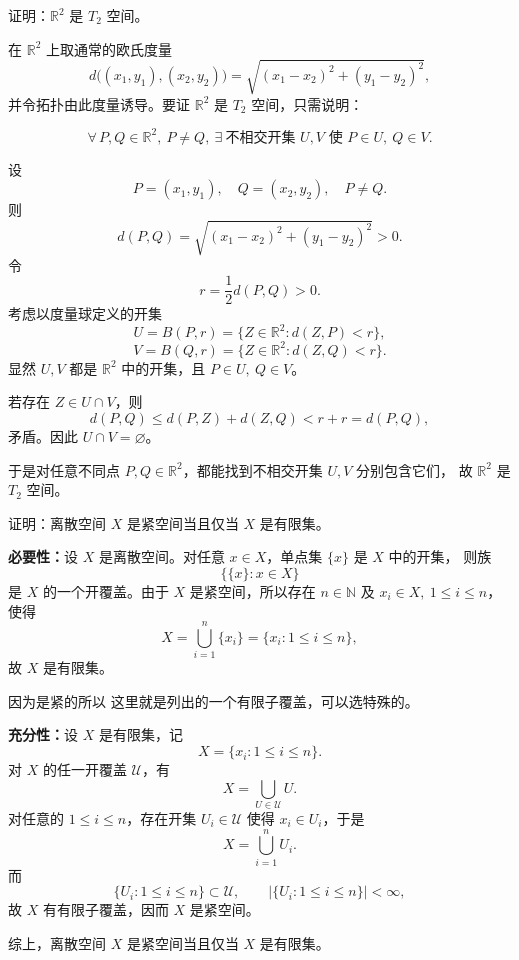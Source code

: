 \begin{homework}[7]
证明：$\mathbb{R}^2$ 是 $T_2$ 空间。
\end{homework}
\begin{solution}
在 $\mathbb{R}^2$ 上取通常的欧氏度量
\[
d\bigl((x_1,y_1),(x_2,y_2)\bigr)
=\sqrt{(x_1-x_2)^2+(y_1-y_2)^2},
\]
并令拓扑由此度量诱导。要证 $\mathbb{R}^2$ 是 $T_2$ 空间，只需说明：

\[
\forall\,P,Q\in\mathbb{R}^2,\ P\neq Q,\ \exists\ \text{不相交开集 }U,V
\text{ 使 }P\in U,\ Q\in V.
\]

设
\[
P=(x_1,y_1),\quad Q=(x_2,y_2),\quad P\neq Q.
\]
则
\[
d(P,Q)=\sqrt{(x_1-x_2)^2+(y_1-y_2)^2}>0.
\]
令
\[
r=\frac{1}{2}d(P,Q)>0.
\]
考虑以度量球定义的开集
\[
U=B(P,r)=\{Z\in\mathbb{R}^2: d(Z,P)<r\},
\]
\[
V=B(Q,r)=\{Z\in\mathbb{R}^2: d(Z,Q)<r\}.
\]
显然 $U,V$ 都是 $\mathbb{R}^2$ 中的开集，且 $P\in U,\ Q\in V$。

若存在 $Z\in U\cap V$，则
\[
d(P,Q)\le d(P,Z)+d(Z,Q)<r+r=d(P,Q),
\]
矛盾。因此 $U\cap V=\varnothing$。

于是对任意不同点 $P,Q\in\mathbb{R}^2$，都能找到不相交开集 $U,V$ 分别包含它们，
故 $\mathbb{R}^2$ 是 $T_2$ 空间。
\end{solution}
\begin{homework}[5.3]
证明：离散空间 $X$ 是紧空间当且仅当 $X$ 是有限集。
\end{homework}
\begin{solution}
\textbf{必要性：}设 $X$ 是离散空间。对任意 $x\in X$，单点集 $\{x\}$ 是 $X$ 中的开集，
则族
\[
\{\{x\}:x\in X\}
\]
是 $X$ 的一个开覆盖。由于 $X$ 是紧空间，所以存在 $n\in\mathbb{N}$ 及
$x_i\in X,\ 1\le i\le n$，使得
\[
X=\bigcup_{i=1}^n\{x_i\}=\{x_i:1\le i\le n\},
\]
故 $X$ 是有限集。
\begin{dxtips}
   因为是紧的所以 这里就是列出的一个有限子覆盖，可以选特殊的。
\end{dxtips}
\textbf{充分性：}设 $X$ 是有限集，记
\[
X=\{x_i:1\le i\le n\}.
\]
对 $X$ 的任一开覆盖 $\mathcal{U}$，有
\[
X=\bigcup_{U\in\mathcal{U}}U.
\]
对任意的 $1\le i\le n$，存在开集 $U_i\in\mathcal{U}$ 使得 $x_i\in U_i$，于是
\[
X=\bigcup_{i=1}^n U_i.
\]
而
\[
\{U_i:1\le i\le n\}\subset\mathcal{U},\qquad
\bigl|\{U_i:1\le i\le n\}\bigr|<\infty,
\]
故 $X$ 有有限子覆盖，因而 $X$ 是紧空间。

综上，离散空间 $X$ 是紧空间当且仅当 $X$ 是有限集。
\end{solution}
